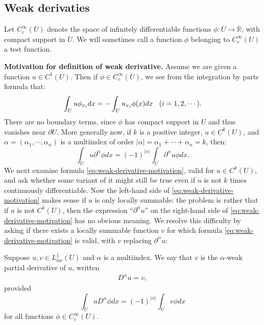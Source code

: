 \lipsum[5]
\subsection{Weak derivaties}
\begin{notation}{}
  Let $C_c^{\infty}(U)$ denote the space of infinitely differentiable functions $\phi:U\to \mathbb{R}$, with compact support in $U$. We will sometimes call a function $\phi$ belonging to $C_{c}^{\infty}(U)$ a test function. 
\end{notation}
\textbf{Motivation for definition of weak derivative.} Assume we are given a function $u \in C^{1}(U)$. Then if $\phi\in C_{c}^{\infty}(U)$, we see from the integration by parts formula that:
\begin{equation}
  \int_{U}u \phi_{x_{i}} dx=-\int_{U}u_{x_{i}}\phi(x) dx \hspace{0.3cm}(i=1,2,\cdots).
\end{equation}
There are no boundary terms, since $\phi$ has compact support in $U$ and thus vanishes near $\partial U$. More generally now, if $k$ is a positive integer, $u\in C^{k}(U)$, and $\alpha=(\alpha_1,\cdots,\alpha_{n})$ is a multiindex of order $|\alpha|=\alpha_1+\cdots+\alpha_n=k$, then:
\begin{equation}\label{eq:weak-derivative-motivation}
  \int_{U}u\partial^{\alpha}\phi dx=(-1)^{|\alpha|}\int_{U}\partial^{\alpha}u \phi dx.
\end{equation}
We next examine formula \cref{eq:weak-derivative-motivation}, valid for $u\in C^{k}(U)$, and ask whether some variant of it might still be true even if $u$ is not $k$ times continuously differentiable. Now the left-hand side of \cref{eq:weak-derivative-motivation} makes sense if $u$ is only locally summable: the problem is rather that if $u$ is not $C^{k}(U)$, then the expression ``$\partial^{\alpha}u$'' on the right-hand side of \cref{eq:weak-derivative-motivation} has no obvious meaning. We resolve this difficulty by asking if there exists a locally summable function $v$ for which formula \cref{eq:weak-derivative-motivation} is valid, with $v$ replacing $\partial^{\alpha}u$:
\begin{definition}{}
  Suppose $u,v\in L^1_{loc}(U)$ and $\alpha$ is a multiindex. We say that $v$ is the $\alpha$-weak partial derivative of $u$, written
  \begin{align*}
    D^{\alpha}u=v,
  \end{align*}
  provided
  \begin{equation}{}\label{eq:int-weak-derivative}
    \int_{U}uD^{\alpha}\phi dx=(-1)^{|\alpha|}\int_{U}v\phi dx
  \end{equation}
  for all functions $\phi\in C^{\infty}_{c}(U)$.
\end{definition}
